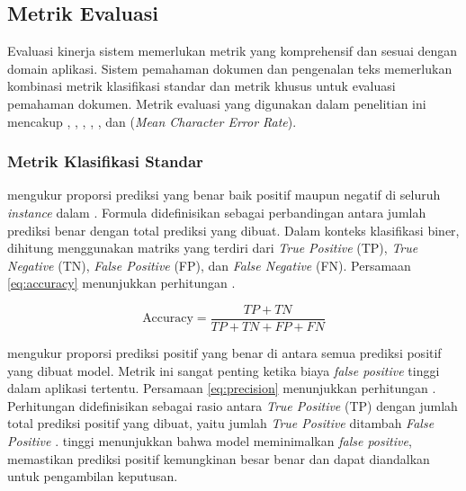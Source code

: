 \subsection{Metrik Evaluasi}
\label{subsec:metrik-evaluasi}

Evaluasi kinerja sistem \ml{} memerlukan metrik yang komprehensif dan sesuai dengan domain aplikasi. Sistem pemahaman dokumen dan pengenalan teks memerlukan kombinasi metrik klasifikasi standar dan metrik khusus untuk evaluasi pemahaman dokumen. Metrik evaluasi yang digunakan dalam penelitian ini mencakup \accuracy, \precision, \recall, \fscore, \coverage, dan \mcer{} (\emph{Mean Character Error Rate}).

\subsubsection{Metrik Klasifikasi Standar}

\accuracyfl{} mengukur proporsi prediksi yang benar baik positif maupun negatif di seluruh \emph{instance} dalam \dataset. Formula \accuracy{} didefinisikan sebagai perbandingan antara jumlah prediksi benar dengan total prediksi yang dibuat. Dalam konteks klasifikasi biner, \accuracy{} dihitung menggunakan matriks yang terdiri dari \emph{True Positive} (TP), \emph{True Negative} (TN), \emph{False Positive} (FP), dan \emph{False Negative} (FN). Persamaan \eqref{eq:accuracy} menunjukkan perhitungan \accuracy{} \parencite{jayaswal2020evalmetrics}. 

\begin{equation}
    \label{eq:accuracy}
\text{Accuracy} = \frac{TP + TN}{TP + TN + FP + FN}
\end{equation}

\precisionfl{} mengukur proporsi prediksi positif yang benar di antara semua prediksi positif yang dibuat model. Metrik ini sangat penting ketika biaya \emph{false positive} tinggi dalam aplikasi tertentu. Persamaan \eqref{eq:precision} menunjukkan perhitungan \precision. Perhitungan \precision{} didefinisikan sebagai rasio antara \emph{True Positive} (TP) dengan jumlah total prediksi positif yang dibuat, yaitu jumlah \emph{True Positive} ditambah \emph{False Positive} \parencite{jayaswal2020evalmetrics}. \precisionfl{} tinggi menunjukkan bahwa model meminimalkan \emph{false positive}, memastikan prediksi positif kemungkinan besar benar dan dapat diandalkan untuk pengambilan keputusan.

